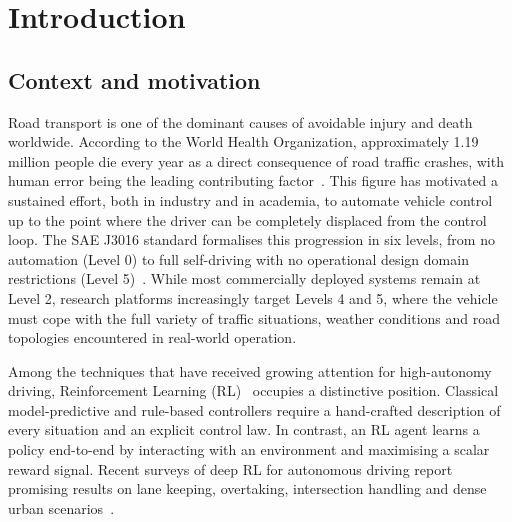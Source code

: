 
\chapter{Introduction}\label{ch:introduction}

\section{Context and motivation}\label{sec:intro-context}

Road transport is one of the dominant causes of avoidable injury and death worldwide. According
to the World Health Organization, approximately 1.19 million people die every year as a direct
consequence of road traffic crashes, with human error being the leading contributing
factor~\cite{who2023road}. This figure has motivated a sustained effort, both in industry and in
academia, to automate vehicle control up to the point where the driver can be completely
displaced from the control loop. The SAE J3016 standard formalises this progression in six
levels, from no automation (Level 0) to full self-driving with no operational design domain
restrictions (Level 5)~\cite{sae2021j3016}. While most commercially deployed systems remain at
Level 2, research platforms increasingly target Levels 4 and 5, where the vehicle must cope with
the full variety of traffic situations, weather conditions and road topologies encountered in
real-world operation.

Among the techniques that have received growing attention for high-autonomy driving,
Reinforcement Learning (RL)~\cite{sutton2018rl} occupies a distinctive position. Classical
model-predictive and rule-based controllers require a hand-crafted description of every
situation and an explicit control law. In contrast, an RL agent learns a policy
end-to-end by interacting with an environment and maximising a scalar reward signal. Recent
surveys of deep RL for autonomous driving report promising results on lane keeping, overtaking,
intersection handling and dense urban scenarios~\cite{kiran2022drlsurvey,aradi2022survey}.

